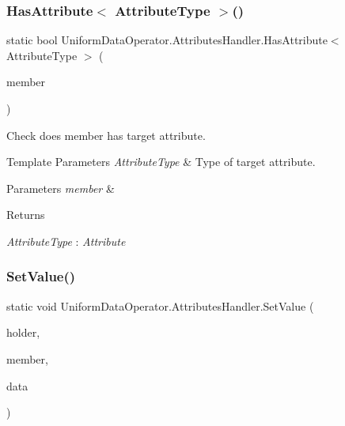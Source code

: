 \subsubsection{\texorpdfstring{Has\+Attribute$<$ Attribute\+Type $>$()}{HasAttribute< AttributeType >()}}
{\footnotesize\ttfamily static bool Uniform\+Data\+Operator.\+Attributes\+Handler.\+Has\+Attribute$<$ Attribute\+Type $>$ (\begin{DoxyParamCaption}\item[{Member\+Info}]{member }\end{DoxyParamCaption})\hspace{0.3cm}{\ttfamily [static]}}



Check does member has target attribute. 


\begin{DoxyTemplParams}{Template Parameters}
{\em Attribute\+Type} & Type of target attribute.\\
\hline
\end{DoxyTemplParams}

\begin{DoxyParams}{Parameters}
{\em member} & \\
\hline
\end{DoxyParams}
\begin{DoxyReturn}{Returns}

\end{DoxyReturn}
\begin{Desc}
\item[Type Constraints]\begin{description}
\item[{\em Attribute\+Type} : {\em Attribute}]\end{description}
\end{Desc}
\mbox{\label{class_uniform_data_operator_1_1_attributes_handler_a2619c62d9978b033619e4bfd248f5290}} 
\subsubsection{\texorpdfstring{Set\+Value()}{SetValue()}}
{\footnotesize\ttfamily static void Uniform\+Data\+Operator.\+Attributes\+Handler.\+Set\+Value (\begin{DoxyParamCaption}\item[{object}]{holder,  }\item[{Member\+Info}]{member,  }\item[{object}]{data }\end{DoxyParamCaption})\hspace{0.3cm}{\ttfamily [static]}}



